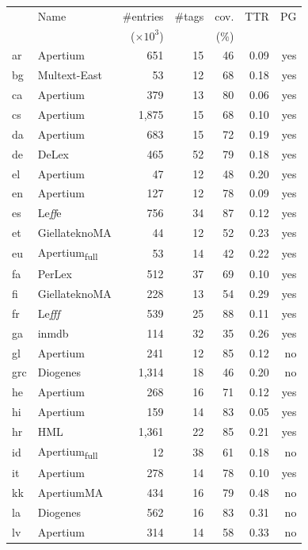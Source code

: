 \documentclass[11pt,a4paper]{article}
\begin{document}
\begin{table}[t]
\centering
\scriptsize
\begin{tabular}{llrrr|rr}
\toprule
 & Name & \#entries & \#tags  & cov.& TTR & PG \\
 &  & ($\times 10^3$) &   & (\%)&  &  \\
\midrule 
ar &   Apertium & 651 & 15 & 46 &0.09& yes \\
bg & Multext-East & 53 &12 & 68 & 0.18 & yes \\
ca &  Apertium & 379 & 13 & 80 & 0.06 & yes \\
cs &  Apertium & 1,875 & 15 & 68 & 0.10 & yes \\
da & Apertium & 683 & 15 & 72 & 0.19 & yes \\
de & DeLex & 465 & 52 & 79 & 0.18 &yes\\
el & Apertium & 47 & 12 & 48 & 0.20 & yes \\
en & Apertium & 127 & 12 & 78 & 0.09& yes \\
es & Le{\it ff}e &  756 & 34 & 87 & 0.12 &yes\\
et & GiellateknoMA & 44 & 12 & 52 & 0.23 & yes \\
eu & Apertium\textsubscript{full} & 53 &  14 & 42 & 0.22 &  yes \\
fa  & PerLex &  512 & 37 & 69 & 0.10 & yes\\
fi & GiellateknoMA & 228 & 13 & 54 & 0.29 & yes \\
fr & Le{\it fff} & 539 & 25 & 88 &0.11 &yes\\
ga & inmdb & 114 & 32 & 35 & 0.26& yes\\
gl & Apertium & 241 & 12 & 85  & 0.12 &no\\
grc  & Diogenes & 1,314 & 18 & 46 & 0.20 &no\\
he & Apertium & 268 & 16 & 71 & 0.12 & yes\\
hi & Apertium & 159 & 14 & 83 & 0.05 & yes\\
hr  & HML   & 1,361 & 22 & 85 & 0.21 & yes \\
id & Apertium\textsubscript{full}& 12 & 38 &61 &0.18 & no   \\
it & Apertium & 278 &14 & 78 & 0.10 & yes\\
kk & ApertiumMA& 434 & 16 &  79 & 0.48 & no\\
la  & Diogenes & 562 & 16 & 83 & 0.31 &no\\
lv & Apertium & 314 & 14  & 58  & 0.33& no \\

\end{tabular}
\end{table}
\end{document}
